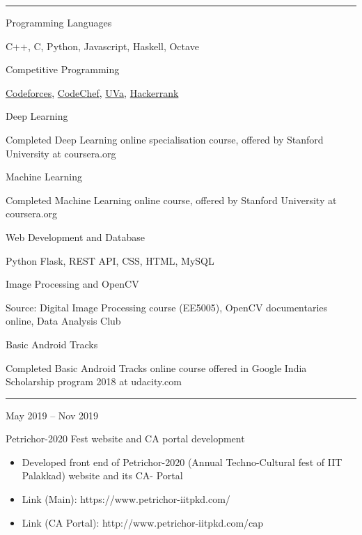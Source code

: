 \documentclass[a4paper,10pt]{article}
\newlength{\cvcolumngapwidth}
\newlength{\cvleftcolumnwidth}
\newlength{\cvrightcolumnwidth}
\newcommand{\cvsectionstyle}[1]{{\normalsize\cvsectionfont\textcolor{cvsectioncolor}{#1}}}
\newcommand{\cvtitlestyle}[1]{{\large\cvtitlefont\textcolor{cvtitlecolor}{#1}}}
\newcommand{\cvdurationstyle}[1]{{\small\cvdurationfont\textcolor{cvdurationcolor}{#1}}}
\newcommand{\cvheadingstyle}[1]{{\normalsize\cvheadingfont\textcolor{cvheadingcolor}{#1}}}
\newlength{\cvafteritemskipamount}
\newlength{\cvaftersectionskipamount}
\newlength{\cvbetweensectionandheadingextraskipamount}
\newlength{\cvaftertitleskipamount}
\newlength{\cvparskip}
\newcommand{\cvsection}[1]{
    \begin{minipage}[t]{\cvleftcolumnwidth}
        \raggedleft\cvsectionstyle{#1}
    \end{minipage}%
    \hspace{\cvcolumngapwidth}%
    \begin{minipage}[t]{\cvrightcolumnwidth}
        \textcolor{cvrulecolor}{\rule{\cvrightcolumnwidth}{0.3mm}}
    \end{minipage}

    \vspace{\cvaftersectionskipamount}
}
\newcommand{\cvitem}[2]{
    \begin{minipage}[t]{\cvleftcolumnwidth}
        \raggedleft #1
    \end{minipage}%
    \hspace{\cvcolumngapwidth}%
    \begin{minipage}[t]{\cvrightcolumnwidth}
        \setlength{\parskip}{\cvparskip} #2
    \end{minipage}

    \vspace{\cvafteritemskipamount}
}
\newcommand{\cvtitle}[1]{
    \cvtitlestyle{#1}

    \vspace{\cvaftertitleskipamount}
    \vspace{-\cvparskip}
}
\begin{document}

\cvsection{TECHNICAL SKILLS}

\vspace{\cvbetweensectionandheadingextraskipamount}

\cvitem{
    \cvheadingstyle{Programming Languages}
}{
    
    C++, C, Python, Javascript, Haskell, Octave

}
\cvitem{
    \cvheadingstyle{Competitive Programming}
}{
    
   \href{https://codeforces.com/profile/DSR}{Codeforces}, \href{https://www.codechef.com/users/devansh08}{CodeChef}, \href{https://uhunt.onlinejudge.org/id/1019683}{UVa}, \href{https://www.hackerrank.com/rathoredevansh}{Hackerrank}
}

\cvitem{
    \cvheadingstyle{Deep Learning}
}{
    Completed Deep Learning online specialisation course, offered by Stanford University at coursera.org
}

\cvitem{
    \cvheadingstyle{Machine Learning}
}{
    Completed Machine Learning online course, offered by Stanford University at coursera.org
}

\cvitem{
    \cvheadingstyle{Web Development and Database}
}{
   Python Flask, REST API, CSS, HTML, MySQL
}

\cvitem{
    \cvheadingstyle{Image Processing and OpenCV}
}{
    
    Source: Digital Image Processing course (EE5005), OpenCV documentaries online, Data Analysis Club 
    
}

\cvitem{
    \cvheadingstyle{Basic Android Tracks}
}{
    
   Completed Basic Android Tracks online course offered in Google India Scholarship program 2018 at udacity.com
}

\cvsection{PROJECTS}

\vspace{\cvbetweensectionandheadingextraskipamount}

\cvitem{
    \cvdurationstyle{May 2019 -- Nov 2019}
}{
    \cvtitle{Petrichor-2020 Fest website and CA portal development  }

    \begin{itemize}[leftmargin=*]
        \item Developed front end of Petrichor-2020 (Annual Techno-Cultural fest of IIT Palakkad) website and its CA- Portal
        \item Link (Main): https://www.petrichor-iitpkd.com/
        \item Link (CA Portal): http://www.petrichor-iitpkd.com/cap
    \end{itemize}
}
\end{document}
